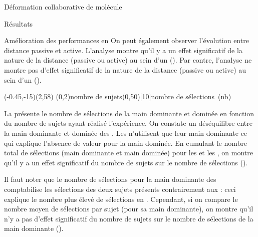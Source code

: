 \documentclass[myfrancais]{mythesis}
\begin{document}
\begin{mychapter}{Déformation collaborative de molécule}
\begin{mysection}{Résultats}
\begin{mysubsection}{Amélioration des performances en }
				On peut également observer l'évolution entre distance passive et active.
				L'analyse montre qu'il y a un effet significatif de la nature de la distance (passive ou active) au sein d'un  ().
				Par contre, l'analyse ne montre pas d'effet significatif de la nature de la distance (passive ou active) au sein d'un  ().

				\begin{myfigure}
					\begin{myps}(-0.45,-15)(2,58)
						\myaxes(0,2){nombre de sujets}(0,50)[10]{nombre de sélections~(nb)}
					\end{myps}
				\end{myfigure}

				La  présente le nombre de sélections de la main dominante et dominée  en fonction du nombre de sujets  ayant réalisé l'expérience.
				On constate un déséquilibre entre la main dominante et dominée des .
				Les  n'utilisent que leur main dominante ce qui explique l'absence de valeur pour la main dominée.
				En cumulant le nombre total de sélections (main dominante et main dominée) pour les  et les , on montre qu'il y a un effet significatif du nombre de sujets  sur le nombre de sélections  ().

				Il faut noter que le nombre de sélections pour la main dominante des  comptabilise les sélections des deux sujets présents contrairement aux  : ceci explique le nombre plus élevé de sélections en .
				Cependant, si on compare le nombre moyen de sélections par sujet (pour sa main dominante), on montre qu'il n'y a pas d'effet significatif du nombre de sujets  sur le nombre de sélections de la main dominante  ().


\end{mysubsection}
\end{mysection}
\end{mychapter}
\end{document}
